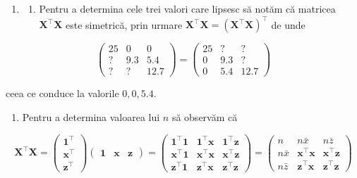 \documentclass[]{article}
\providecommand{\tightlist}{%
  \setlength{\itemsep}{0pt}\setlength{\parskip}{0pt}}
\begin{document}
\begin{enumerate}
\def\labelenumi{\arabic{enumi}.}
\item
  \begin{enumerate}
  \def\labelenumii{\alph{enumii})}
  \tightlist
  \item
    Pentru a determina cele trei valori care lipsesc să notăm că
    matricea \(\boldsymbol X^\intercal\boldsymbol X\) este simetrică,
    prin urmare
    \(\boldsymbol X^\intercal\boldsymbol X = \left(\boldsymbol X^\intercal\boldsymbol X\right)^\intercal\)
    de unde
  \end{enumerate}
\end{enumerate}

\[
  \begin{pmatrix}25 & 0 & 0\\
  ? & 9.3 & 5.4\\
  ? & ? & 12.7\end{pmatrix} = \begin{pmatrix}25 & ? & ?\\
  0 & 9.3 & ?\\
  0 & 5.4 & 12.7\end{pmatrix}
\]

ceea ce conduce la valorile \(0, 0, 5.4\).

\begin{enumerate}
\def\labelenumi{\alph{enumi})}
\setcounter{enumi}{1}
\tightlist
\item
  Pentru a determina valoarea lui \(n\) să observăm că
\end{enumerate}

\[
  \boldsymbol X^\intercal\boldsymbol X = \begin{pmatrix}\mathbf{1}^\intercal \\
  \boldsymbol x^\intercal\\
  \boldsymbol z^\intercal\end{pmatrix}\begin{pmatrix}\mathbf{1} &
  \boldsymbol x &
  \boldsymbol z\end{pmatrix} = \begin{pmatrix}\mathbf{1}^\intercal \mathbf{1} & \mathbf{1}^\intercal\boldsymbol x & \mathbf{1}^\intercal\boldsymbol z \\
  \boldsymbol x^\intercal\mathbf{1} & \boldsymbol x^\intercal\boldsymbol x & \boldsymbol x^\intercal\boldsymbol z\\
  \boldsymbol z^\intercal\mathbf{1} & \boldsymbol z^\intercal\boldsymbol x & \boldsymbol z^\intercal\boldsymbol z\end{pmatrix} = \begin{pmatrix}n & n\bar x & n\bar z \\
  n\bar x & \boldsymbol x^\intercal\boldsymbol x & \boldsymbol x^\intercal\boldsymbol z\\
  n\bar z & \boldsymbol z^\intercal\boldsymbol x & \boldsymbol z^\intercal\boldsymbol z\end{pmatrix}
\]
\end{document}
